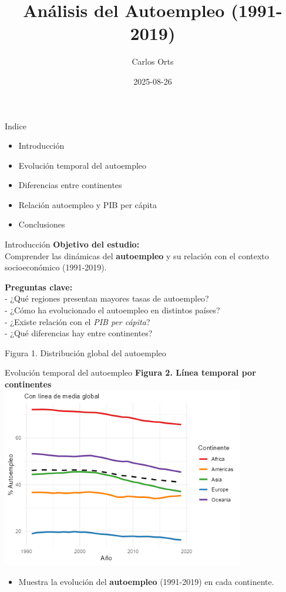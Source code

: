 \documentclass[
  ignorenonframetext,
]{beamer}
\title{Análisis del Autoempleo (1991-2019)}
\author{Carlos Orts}
\date{2025-08-26}
\providecommand{\tightlist}{%
  \setlength{\itemsep}{0pt}\setlength{\parskip}{0pt}}
\begin{document}
\frame{\titlepage}

\begin{frame}{Indice}
\label{indice}
\begin{itemize}
\tightlist
\item
  Introducción
\item
  Evolución temporal del autoempleo
\item
  Diferencias entre continentes
\item
  Relación autoempleo y PIB per cápita
\item
  Conclusiones
\end{itemize}
\end{frame}

\begin{frame}{Introducción}
\label{introducciuxf3n}
\textbf{Objetivo del estudio:}\\
Comprender las dinámicas del \textbf{autoempleo} y su relación con el
contexto socioeconómico (1991-2019).

\textbf{Preguntas clave:}\\
- ¿Qué regiones presentan mayores tasas de autoempleo?\\
- ¿Cómo ha evolucionado el autoempleo en distintos países?\\
- ¿Existe relación con el \emph{PIB per cápita}?\\
- ¿Qué diferencias hay entre continentes?

Figura 1. Distribución global del autoempleo
\end{frame}

\begin{frame}{Evolución temporal del autoempleo}
\label{evoluciuxf3n-temporal-del-autoempleo}
\textbf{Figura 2. Línea temporal por continentes}\\
\includegraphics[width=4.16667in,height=\textheight]{../informe/img/linea_temportal_continentes.png}

\begin{itemize}
\tightlist
\item
  Muestra la evolución del \textbf{autoempleo} (1991-2019) en cada
  continente.
\end{itemize}
\end{frame}
\end{document}
